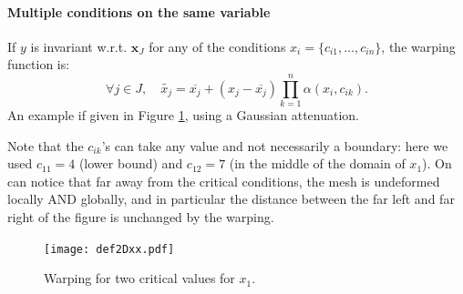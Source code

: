 \documentclass[a4paper,10pt]{article}
\newcommand{\x}{\mathbf{x}}
\newcommand{\cc}{\mathbf{c}}
\begin{document}
\paragraph{Multiple conditions on the same variable}
If $y$ is invariant w.r.t. $\x_J$ for any of the conditions $x_i = \{c_{i1}, \ldots, c_{in} \}$, the warping function is:
\begin{equation}
 \forall j \in J, \quad \widetilde{x_j} = \overline{x_j} + \left( x_j - \overline{x_j}\right) \prod_{k=1}^n \alpha(x_i, c_{ik}).\label{eq:mult}
\end{equation}
An example if given in Figure \ref{fig:def2Dxx}, using a Gaussian attenuation.

Note that the $c_{ik}$'s can take any value and not necessarily a boundary: %
here we used $c_{11}=4$ (lower bound) and $c_{12}=7$ (in the middle of the domain of $x_1$).
On can notice that far away from the critical conditions, the mesh is undeformed locally AND globally, 
and in particular the distance between the far left and far right of the figure is unchanged by the warping.

\begin{figure}[!ht]
 \centering
 \texttt{[image: def2Dxx.pdf]}
 \caption{Warping for two critical values for $x_1$.}\label{fig:def2Dxx}
\end{figure}

\end{document}
